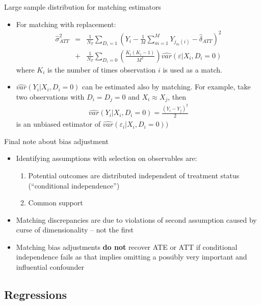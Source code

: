 \documentclass{beamer}
\begin{document}
\begin{frame}{Large sample distribution for matching estimators}
	
	\begin{itemize}
	\item For matching with replacement:
		\begin{eqnarray*}
		\widehat{\sigma}^2_{ATT} &=& \frac{1}{N_T} \sum_{D_i=1} \left( Y_i - \frac{1}{M} \sum_{m=1}^M Y_{j_m(i)} - \widehat{\delta}_{ATT} \right)^2 \\
		&+& \frac{1}{N_T} \sum_{D_i=0} \left( \frac{K_i(K_i-1)}{M^2} \right) \widehat{var}(\varepsilon | X_i,D_i=0)
		\end{eqnarray*}where $K_i$ is the number of times observation $i$ is used as a match.
	\item $\widehat{var}(Y_i | X_i,D_i=0)$ can be estimated also by matching.  For example, take two observations with $D_i=D_j=0$ and $X_i \approx X_j$, then
		\begin{eqnarray*}
		\widehat{var}(Y_i | X_i,D_i=0) = \frac{(Y_i-Y_j)^2}{2}
		\end{eqnarray*}is an unbiased estimator of $\widehat{var}(\varepsilon_i | X_i,D_i=0))$
	\end{itemize}
\end{frame}

\begin{frame}{Final note about bias adjustment}

\begin{itemize}
\item Identifying assumptions with selection on observables are:
	\begin{enumerate}
	\item Potential outcomes are distributed independent of treatment status (``conditional independence'')
	\item Common support
	\end{enumerate}
\item Matching discrepancies are due to violations of second assumption caused by curse of dimensionality -- not the first
\item Matching bias adjustments \textbf{do not} recover ATE or ATT if conditional independence fails as that implies omitting a possibly very important and influential confounder
\end{itemize}

\end{frame}

\subsection{Regressions}
\end{document}
